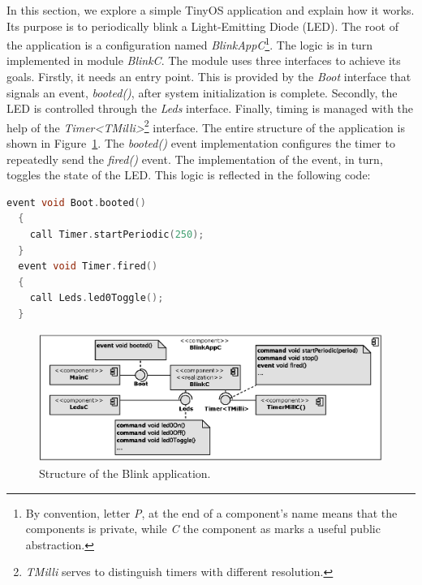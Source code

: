 In this section, we explore a simple TinyOS application and explain how it works. Its purpose is to periodically blink a Light-Emitting Diode (LED). The root of the application is a configuration named \emph{BlinkAppC}\footnote{By convention, letter \emph{P}, at the end of a component's name means that the components is private, while \emph{C} the component as marks a useful public abstraction.}. The logic is in turn implemented in module \emph{BlinkC}. The module uses three interfaces to achieve its goals. Firstly, it needs an entry point. This is provided by the \emph{Boot} interface that signals an event, \emph{booted()}, after system initialization is complete.  Secondly, the LED is controlled through the \emph{Leds} interface. Finally, timing is managed with the help of the \emph{Timer<TMilli>}\footnote{\emph{TMilli} serves to distinguish timers with different resolution.} interface. The entire structure of the application is shown in Figure~\ref{fig:app_anatomy}.  The \emph{booted()} event implementation configures the timer to repeatedly send the \emph{fired()} event. The implementation of the event, in turn, toggles the state of the LED. This logic is reflected in the following code:

\begin{lstlisting}[numbers=none, keywordstyle=\bfseries, language=C]
  event void Boot.booted()
  {
    call Timer.startPeriodic(250);
  }
  event void Timer.fired()
  {
    call Leds.led0Toggle();
  }
\end{lstlisting}

\begin{figure}[h]
  \centering
  \includegraphics[width=1.01\textwidth]{diagrams/app_anatomy.eps}
  \caption{Structure of the Blink application.}
  \label{fig:app_anatomy}
\end{figure}

